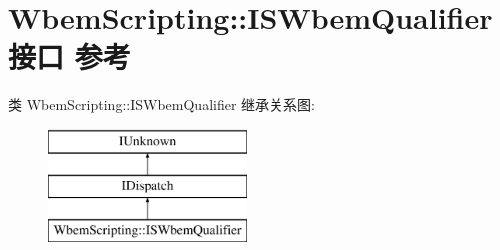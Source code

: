 \hypertarget{interface_wbem_scripting_1_1_i_s_wbem_qualifier}{}\section{Wbem\+Scripting\+:\+:I\+S\+Wbem\+Qualifier接口 参考}
\label{interface_wbem_scripting_1_1_i_s_wbem_qualifier}
类 Wbem\+Scripting\+:\+:I\+S\+Wbem\+Qualifier 继承关系图\+:\begin{figure}[H]
\begin{center}
\leavevmode
\includegraphics[height=3.000000cm]{interface_wbem_scripting_1_1_i_s_wbem_qualifier}
\end{center}
\end{figure}
